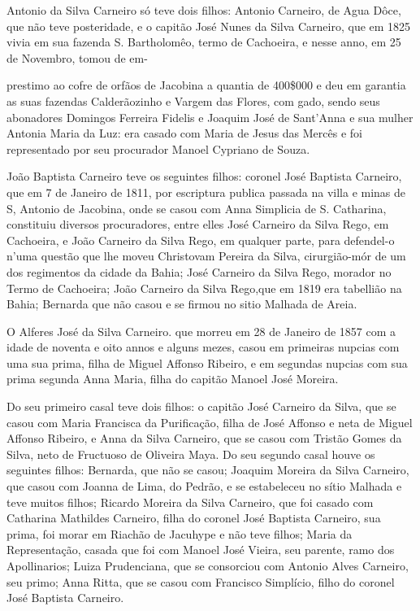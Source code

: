 Antonio da Silva Carneiro só teve dois filhos: Antonio Carneiro, de Agua Dôce, que não teve posteridade, e o capitão José Nunes da Silva Carneiro, que em 1825 vivia em sua fazenda S. Bartholomêo, termo de Cachoeira, e nesse anno, em 25 de Novembro, tomou de em-


prestimo ao cofre de orfãos de Jacobina a quantia de 400\$000 e deu em garantia as suas fazendas Calderãozinho e Vargem das Flores, com gado, sendo seus abonadores Domingos Ferreira Fidelis e Joaquim José de Sant'Anna e sua mulher Antonia Maria da Luz: era casado com Maria de Jesus das Mercês e foi representado por seu procurador Manoel Cypriano de Souza.

João Baptista Carneiro teve os seguintes filhos: coronel José Baptista Carneiro, que em 7 de Janeiro de 1811, por escriptura publica passada na villa e minas de S, Antonio de Jacobina, onde se casou com Anna Simplicia de S. Catharina, constituiu diversos procuradores, entre elles José Carneiro da Silva Rego, em Cachoeira, e João Carneiro da Silva Rego, em qualquer
parte, para defendel-o n'uma questão que lhe moveu Christovam Pereira da Silva, cirurgião-mór de um dos regimentos da cidade da Bahia; José Carneiro da Silva Rego, morador no Termo de Cachoeira; João Carneiro da Silva Rego,que em 1819 era tabellião na Bahia; Bernarda que não casou e se firmou no sitio Malhada de Areia.

O Alferes José da Silva Carneiro. que morreu em 28 de Janeiro de 1857 com a idade de noventa e oito annos e alguns mezes, casou em primeiras nupcias com uma sua prima, filha de Miguel Affonso Ribeiro, e em segundas nupcias com sua prima segunda Anna Maria, filha do	capitão Manoel José Moreira.


Do seu primeiro casal teve dois filhos: o capitão José Carneiro da Silva, que se casou com Maria Francisca da Purificação, filha de José Affonso e neta de Miguel Affonso Ribeiro, e Anna da Silva Carneiro, que se casou com Tristão Gomes da Silva, neto de Fructuoso de Oliveira Maya. Do seu segundo casal houve os seguintes filhos: Bernarda, que não se casou; Joaquim Moreira da Silva Carneiro, que casou com Joanna de Lima, do Pedrão, e se estabeleceu no sítio Malhada e teve muitos filhos; Ricardo Moreira da Silva Carneiro, que foi casado com Catharina Mathildes Carneiro, filha do coronel José Baptista Carneiro, sua prima, foi morar em Riachão de Jacuhype e não teve filhos; Maria da Representação, casada que foi com Manoel José Vieira, seu parente, ramo dos Apollinarios; Luiza Prudenciana, que se consorciou com Antonio Alves Carneiro, seu primo; Anna Ritta, que se casou com Francisco Simplício, filho do coronel José Baptista Carneiro.

